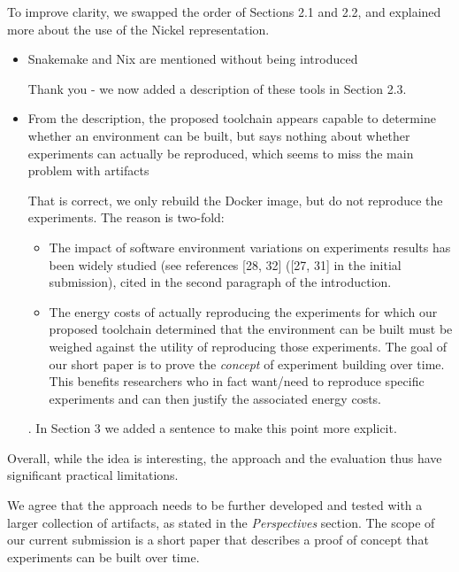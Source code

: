 \documentclass[%
	11pt,
	final,
]{article}
\begin{document}
\begin{itemize}
\begin{itemize}
\begin{review-answer}
  To improve clarity, we swapped the order of Sections 2.1 and 2.2, and explained more about the use of the Nickel representation.
\end{review-answer}
   \begin{itemize}
    \item Snakemake and Nix are mentioned without being introduced
      \begin{review-answer}
        Thank you - we now added a description of these tools in Section 2.3.
      \end{review-answer}
    \item From the description, the proposed toolchain appears capable to determine whether an environment can be built, but says nothing about whether experiments can actually be reproduced, which seems to miss the main problem with artifacts
      \begin{review-answer}
        That is correct, we only rebuild the Docker image, but do not reproduce the experiments.
        The reason is two-fold:
        \begin{itemize}
        \item The impact of software environment variations on experiments results has been widely studied (see references [28, 32] ([27, 31] in the initial submission), cited in the second paragraph of the introduction.
        \item The energy costs of actually reproducing the experiments for which our proposed toolchain determined that the environment can be built must be weighed against the utility of reproducing those experiments.
          The goal of our short paper is to prove the \textit{concept} of experiment building over time.
          This benefits researchers who in fact want/need to reproduce specific experiments and can then justify the associated energy costs.
        \end{itemize}.
        In Section 3 we added a sentence to make this point more explicit.
      \end{review-answer}
    \end{itemize}
    \end{itemize}
\end{itemize}

Overall, while the idea is interesting, the approach and the evaluation thus have significant practical limitations.

\begin{review-answer}
  We agree that the approach needs to be further developed and tested with a larger collection of artifacts, as stated in the \emph{Perspectives} section.
  The scope of our current submission is a short paper that describes a proof of concept that experiments can be built over time.
\end{review-answer}
\end{document}
